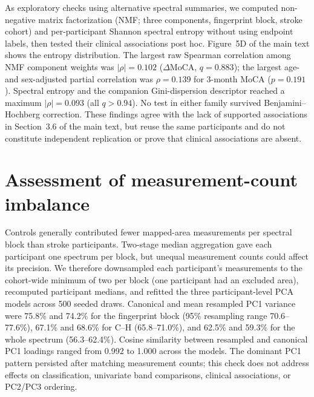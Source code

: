 \documentclass[preprint,12pt]{elsarticle}
\begin{document}
As exploratory checks using alternative spectral summaries, we computed non-negative matrix factorization (NMF; three components, fingerprint block, stroke cohort) and per-participant Shannon spectral entropy without using endpoint labels, then tested their clinical associations post hoc. Figure~5D of the main text shows the entropy distribution. The largest raw Spearman correlation among NMF component weights was $|\rho|=0.102$ ($\Delta$MoCA, $q=0.883$); the largest age- and sex-adjusted partial correlation was $\rho=0.139$ for 3-month MoCA ($p=0.191$). Spectral entropy and the companion Gini-dispersion descriptor reached a maximum $|\rho|=0.093$ (all $q>0.94$). No test in either family survived Benjamini--Hochberg correction. These findings agree with the lack of supported associations in Section~3.6 of the main text, but reuse the same participants and do not constitute independent replication or prove that clinical associations are absent.


\section{Assessment of measurement-count imbalance}
\label{sec:measurement_imbalance}

Controls generally contributed fewer mapped-area measurements per spectral block than stroke participants. Two-stage median aggregation gave each participant one spectrum per block, but unequal measurement counts could affect its precision. We therefore downsampled each participant's measurements to the cohort-wide minimum of two per block (one participant had an excluded area), recomputed participant medians, and refitted the three participant-level PCA models across 500 seeded draws. Canonical and mean resampled PC1 variance were 75.8\% and 74.2\% for the fingerprint block (95\% resampling range 70.6--77.6\%), 67.1\% and 68.6\% for C--H (65.8--71.0\%), and 62.5\% and 59.3\% for the whole spectrum (56.3--62.4\%). Cosine similarity between resampled and canonical PC1 loadings ranged from 0.992 to 1.000 across the models. The dominant PC1 pattern persisted after matching measurement counts; this check does not address effects on classification, univariate band comparisons, clinical associations, or PC2/PC3 ordering.



\end{document}
